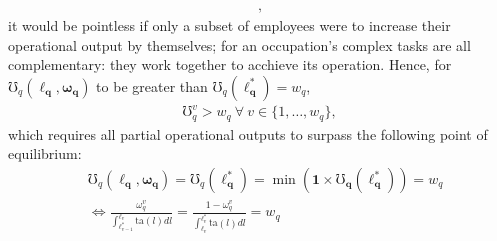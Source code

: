 \documentclass[hidelinks, nonatbib]{elsarticle}
\begin{document}
\begin{enumerate}
\begin{gather}
        ,
    \end{gather}
    it would be pointless if only a subset of employees were to increase their operational output by themselves; for an occupation's complex tasks are all complementary: they work together to acchieve its operation. Hence, for $\mho_{q}(
        \boldsymbol{\ell_q}
        ,\boldsymbol{\omega_q}
    )$ to be greater than $
    \mho_{q}(
        \boldsymbol{\ell_{q}^{*}}
    )
    =
    w_q$,
    \begin{gather}
        \mho_{q}^{v} > w_q
        \
        \forall
        \
        v \in \{1, \dots, w_q\}
        ,
    \end{gather}
    which requires all partial operational outputs to surpass the following point of equilibrium:
    \begin{align}
        &\mho_{q}(
            \boldsymbol{\ell_q}
            ,\boldsymbol{\omega_q}
        ) 
        =
        \mho_{q}(
            \boldsymbol{\ell_{q}^{*}}
        ) 
        = 
        \min(
            \boldsymbol{1}
            \times
            \boldsymbol{\mho_q}(
                \boldsymbol{\ell_{q}^{*}}
            )
        )
        =
        w_q
        \\
        &\iff
        \frac{
            \omega_{q}^{v}
        }{
            \int_{
                \ell_{v-1}^{*}
            }^{
                \ell_{v}
            }{
                \text{ta}(l)dl
            }
        }
        =
        \frac{
            1 - \omega_{q}^{v}
        }{
            \int_{
                \ell_{v}
            }^{
                \ell_{v}^{*}
            }{
                \text{ta}(l)dl
            }
        }
        =
        w_q

\end{align}
\end{enumerate}
\end{document}
